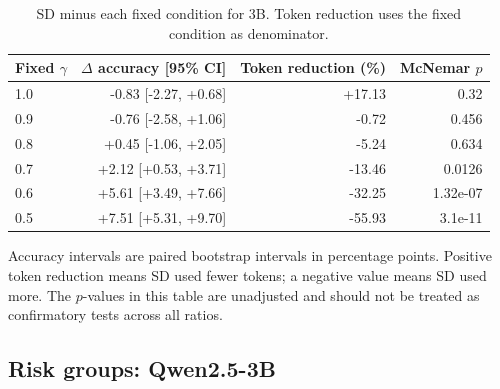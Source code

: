 \begin{table}[H]\centering\small

\caption{SD minus each fixed condition for 3B. Token reduction uses the fixed condition as denominator.}

\begin{tabular}{lrrr}

\toprule

Fixed $\gamma$ & $\Delta$ accuracy [95\% CI] & Token reduction (\%) & McNemar $p$\\

\midrule

1.0 & -0.83 [-2.27, +0.68] & +17.13 & 0.32\\

0.9 & -0.76 [-2.58, +1.06] & -0.72 & 0.456\\

0.8 & +0.45 [-1.06, +2.05] & -5.24 & 0.634\\

0.7 & +2.12 [+0.53, +3.71] & -13.46 & 0.0126\\

0.6 & +5.61 [+3.49, +7.66] & -32.25 & 1.32e-07\\

0.5 & +7.51 [+5.31, +9.70] & -55.93 & 3.1e-11\\

\bottomrule\end{tabular}\end{table}

Accuracy intervals are paired bootstrap intervals in percentage points. Positive token reduction means SD used fewer tokens; a negative value means SD used more. The $p$-values in this table are unadjusted and should not be treated as confirmatory tests across all ratios.

\subsection{Risk groups: Qwen2.5-3B}

